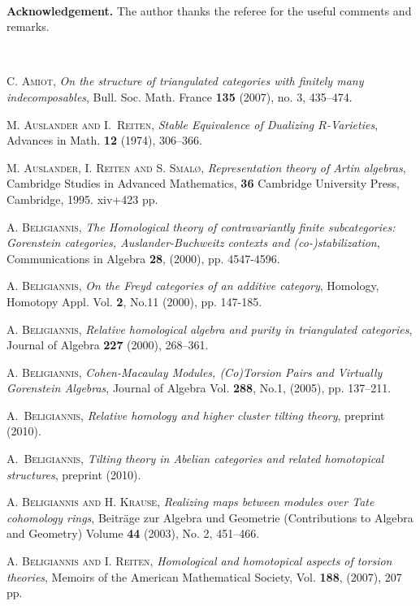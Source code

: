 \documentclass[oneside, a4paper,reqno]{amsart}
\numberwithin{equation}{section}
\theoremstyle{definition}
\begin{document}
\,

{\bf Acknowledgement.}  The author thanks the referee for the useful comments and remarks.

\

\begin{thebibliography}{99}

\textsc{C. Amiot}, {\em On the structure of triangulated categories with finitely many indecomposables},  
Bull. Soc. Math. France {\bf 135} (2007), no. 3, 435--474. 

\textsc{M. Auslander and I.~Reiten}, \textit{Stable Equivalence of
Dualizing $R$-Varieties}, Advances in Math. {\bf 12} (1974),
306--366.

\textsc{M. Auslander, I. Reiten and S. Smal{\o}}, \textit{Representation theory of Artin algebras}, Cambridge Studies in Advanced Mathematics, {\bf 36} Cambridge University Press, Cambridge, 1995. xiv+423 pp.

\textsc{A. Beligiannis}, {\em The Homological theory of contravariantly finite subcategories: Gorenstein categories,  Auslander-Buchweitz contexts and (co-)stabilization},  Communications in Algebra {\bf 28}, (2000),  pp. 4547-4596.

\textsc{A. Beligiannis}, {\em On the Freyd categories of an additive category}, Homology, Homotopy Appl. Vol. {\bf 2}, No.11  (2000),  pp. 147-185.

\textsc{A. Beligiannis}, {\em Relative homological algebra and purity in triangulated categories}, Journal of Algebra {\bf 227} (2000), 268--361. 

\textsc{A. Beligiannis}, {\em Cohen-Macaulay Modules, (Co)Torsion Pairs and Virtually Gorenstein Algebras}, Journal of Algebra Vol. {\bf 288}, No.1, (2005), pp. 137--211.

\textsc{A.~Beligiannis}, \textit{Relative homology and higher cluster tilting theory}, preprint (2010).

\textsc{A.~Beligiannis}, \textit{Tilting theory in Abelian categories and related homotopical structures}, preprint (2010).

\textsc{A. Beligiannis and H. Krause}, {\em Realizing maps between modules over Tate cohomology rings}, 
Beitr\"{a}ge zur Algebra und Geometrie (Contributions to Algebra and Geometry) Volume {\bf 44} (2003), No. 2, 451--466.

\textsc{A. Beligiannis and I. Reiten}, {\em Homological and homotopical aspects of torsion theories}, Memoirs of the American Mathematical Society,  Vol. {\bf 188}, (2007), 207 pp. 


\end{thebibliography}
\end{document}
